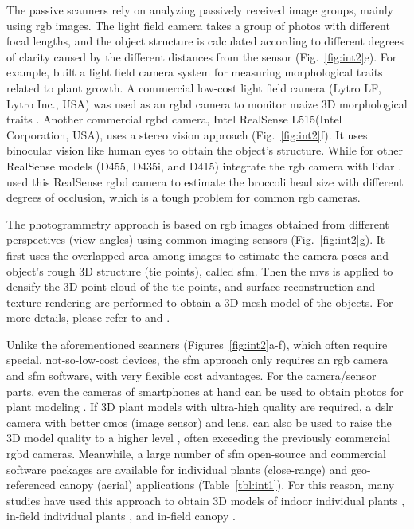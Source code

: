 The passive scanners rely on analyzing passively received image groups, mainly using \gls{rgb} images. The light field camera takes a group of photos with different focal lengths, and the object structure is calculated according to different degrees of clarity caused by the different distances from the sensor (Fig.~\ref{fig:int2}e). For example, \citet{apelt_phytotyping_2015} built a light field camera system for measuring morphological traits related to plant growth. A commercial low-cost light field camera (Lytro LF, Lytro Inc., USA) was used as an \gls{rgbd} camera to monitor maize 3D morphological traits \citep{schima_imagine_2016}. Another commercial \gls{rgbd} camera, Intel RealSense L515(Intel Corporation, USA), uses a stereo vision approach (Fig.~\ref{fig:int2}f). It uses binocular vision like human eyes to obtain the object's structure. While for other RealSense models (D455, D435i, and D415) integrate the \gls{rgb} camera with \gls{lidar} \citep[Table 5]{bartol_review_2021}. \citet{blok_image_2021} used this RealSense \gls{rgbd} camera to estimate the broccoli head size with different degrees of occlusion, which is a tough problem for common \gls{rgb} cameras. 

The photogrammetry approach is based on \gls{rgb} images obtained from different perspectives (view angles) using common imaging sensors (Fig.~\ref{fig:int2}g). It first uses the overlapped area among images to estimate the camera poses and object's rough 3D structure (tie points), called \acrfull{sfm}. Then the \gls{mvs} is applied to densify the 3D point cloud of the tie points, and surface reconstruction and texture rendering are performed to obtain a 3D mesh model of the objects. For more details, please refer to \citet{hartley_multiple_2000} and \citet{snavely_scene_2010}.

Unlike the aforementioned scanners (Figures~\ref{fig:int2}a-f), which often require special, not-so-low-cost devices, the \gls{sfm} approach only requires an \gls{rgb} camera and \gls{sfm} software, with very flexible cost advantages. For the camera/sensor parts, even the cameras of smartphones at hand can be used to obtain photos for plant modeling \citep{li_measuring_2020}. If 3D plant models with ultra-high quality are required, a \gls{dslr} camera with better \gls{cmos} (image sensor) and lens, can also be used to raise the 3D model quality to a higher level \citep{nguyen_3d_2016, drofova_use_2023}, often exceeding the previously commercial \gls{rgbd} cameras. Meanwhile, a large number of \gls{sfm} open-source and commercial software packages are available for individual plants (close-range) and geo-referenced canopy (aerial) applications (Table~\ref{tbl:int1}). For this reason, many studies have used this approach to obtain 3D models of indoor individual plants \citep{wu_mvs-pheno_2020, zhou_automated_2019}, in-field individual plants \citep{jay_field_2015, herrero_structural_2023}, and in-field canopy \citep{kim_modeling_2018, herrero_canopy_2020}.

